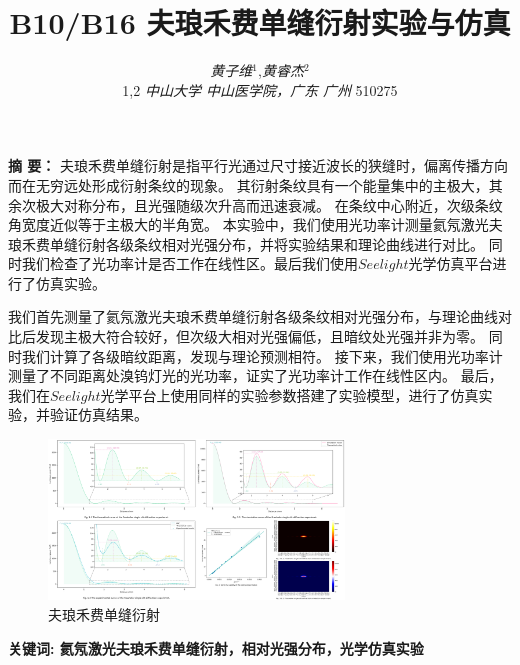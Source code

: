 \documentclass[12pt,a4paper,UTF8]{ctexart}
\begin{document}
\title{\vspace{-2cm}\LARGE\bfseries B10/B16 夫琅禾费单缝衍射实验与仿真\footnotemark[1]}
\author{\large\textit{黄子维}$^{1}$\footnotemark[2],\large\textit{黄睿杰}$^{2}$\footnotemark[3] \\ 
\small{1,2 \textit{中山大学 中山医学院，广东 广州 }510275}}
\date{}
\maketitle
\setcounter{page}{0}
\thispagestyle{empty}
\vspace{-1.5em}
\begin{spacing}{2.0}
{\bfseries 摘 {} 要：}
夫琅禾费单缝衍射是指平行光通过尺寸接近波长的狭缝时，偏离传播方向而在无穷远处形成衍射条纹的现象。
其衍射条纹具有一个能量集中的主极大，其余次极大对称分布，且光强随级次升高而迅速衰减。
在条纹中心附近，次级条纹角宽度近似等于主极大的半角宽。
本实验中，我们使用光功率计测量氦氖激光夫琅禾费单缝衍射各级条纹相对光强分布，并将实验结果和理论曲线进行对比。
同时我们检查了光功率计是否工作在线性区。最后我们使用$Seelight$光学仿真平台进行了仿真实验。

我们首先测量了氦氖激光夫琅禾费单缝衍射各级条纹相对光强分布，与理论曲线对比后发现主极大符合较好，但次级大相对光强偏低，且暗纹处光强并非为零。
同时我们计算了各级暗纹距离，发现与理论预测相符。
接下来，我们使用光功率计测量了不同距离处溴钨灯光的光功率，证实了光功率计工作在线性区内。
最后，我们在$Seelight$光学平台上使用同样的实验参数搭建了实验模型，进行了仿真实验，并验证仿真结果。

\begin{figure}[htbp]
	\centering
	\includegraphics[width=0.7\textwidth]{attachments/Fig.0.pdf}
	\caption{夫琅禾费单缝衍射}
	\label{fig:0}
\end{figure}
\par
\vspace{-0.5em}
\bfseries{关键词}: 氦氖激光夫琅禾费单缝衍射，相对光强分布，光学仿真实验
\vspace{0.5em}
\end{spacing}
\end{document}
